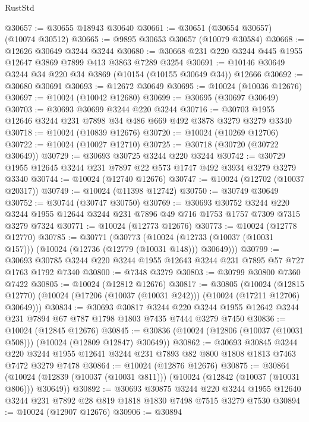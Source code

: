\begin{lexlean}{RustStd}
\begin{coremodule}
@30657 := @30655 @18943 @30640
@30661 := @30651 (@30654 @30657) (@10074 @30512)
@30665 := @9895 @30653 @30657 (@10079 @30584)
@30668 := @12626 @30649 @3244 @3244
@30680 := @30668 @231 @220 @3244 @445 @1955 @12647 @3869 @7899 @413 @3863 @7289 @3254
@30691 := @10146 @30649 @3244 @34 @220 @34 @3869 (@10154 (@10155 @30649 @34)) @12666
@30692 := @30680 @30691
@30693 := @12672 @30649
@30695 := @10024 (@10036 @12676)
@30697 := @10024 (@10042 @12680)
@30699 := @30695 (@30697 @30649)
@30703 := @30693 @30699 @3244 @220 @3244
@30716 := @30703 @1955 @12646 @3244 @231 @7898 @34 @486 @669 @492 @3878 @3279 @3279 @3340
@30718 := @10024 (@10839 @12676)
@30720 := @10024 (@10269 @12706)
@30722 := @10024 (@10027 @12710)
@30725 := @30718 (@30720 (@30722 @30649))
@30729 := @30693 @30725 @3244 @220 @3244
@30742 := @30729 @1955 @12645 @3244 @231 @7897 @22 @573 @1747 @492 @3934 @3279 @3279 @3340
@30744 := @10024 (@12740 @12676)
@30747 := @10024 (@12702 (@10037 @20317))
@30749 := @10024 (@11398 @12742)
@30750 := @30749 @30649
@30752 := @30744 (@30747 @30750)
@30769 := @30693
    @30752
    @3244
    @220
    @3244
    @1955
    @12644
    @3244
    @231
    @7896
    @49
    @716
    @1753
    @1757
    @7309
    @7315
    @3279
    @7324
@30771 := @10024 (@12773 @12676)
@30773 := @10024 (@12778 @12770)
@30785 := @30771
    (@30773
      (@10024 (@12733 (@10037 (@10031 @157))) (@10024 (@12736 (@12779 (@10031 @148))) @30649)))
@30799 := @30693 @30785 @3244 @220 @3244 @1955 @12643 @3244 @231 @7895 @57 @727 @1763 @1792 @7340
@30800 := @7348 @3279
@30803 := @30799 @30800 @7360 @7422
@30805 := @10024 (@12812 @12676)
@30817 := @30805
    (@10024
      (@12815 @12770)
      (@10024 (@17206 (@10037 (@10031 @242))) (@10024 (@17211 @12706) @30649)))
@30834 := @30693
    @30817
    @3244
    @220
    @3244
    @1955
    @12642
    @3244
    @231
    @7894
    @67
    @787
    @1798
    @1803
    @7435
    @7444
    @3279
    @7450
@30836 := @10024 (@12845 @12676)
@30845 := @30836 (@10024 (@12806 (@10037 (@10031 @508))) (@10024 (@12809 @12847) @30649))
@30862 := @30693
    @30845
    @3244
    @220
    @3244
    @1955
    @12641
    @3244
    @231
    @7893
    @82
    @800
    @1808
    @1813
    @7463
    @7472
    @3279
    @7478
@30864 := @10024 (@12876 @12676)
@30875 := @30864
    (@10024 (@12839 (@10037 (@10031 @811))) (@10024 (@12842 (@10037 (@10031 @806))) @30649))
@30892 := @30693
    @30875
    @3244
    @220
    @3244
    @1955
    @12640
    @3244
    @231
    @7892
    @28
    @819
    @1818
    @1830
    @7498
    @7515
    @3279
    @7530
@30894 := @10024 (@12907 @12676)
@30906 := @30894

\end{coremodule}
\end{lexlean}

